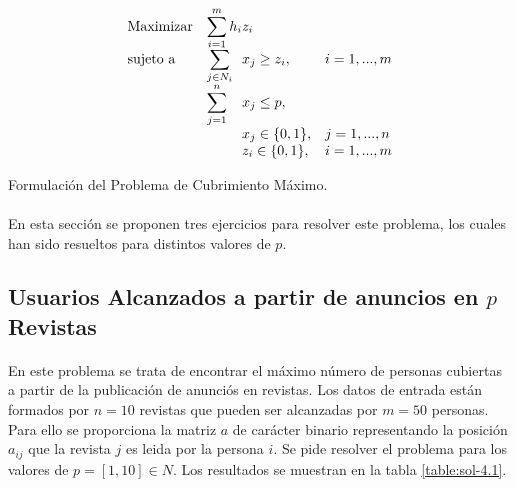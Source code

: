 \documentclass[spanish]{article}
\begin{document}
		\begin{eqfloat}
			\begin{equation}
				\begin{array}{ll@{}ll}
					\text{Maximizar}
						& \displaystyle\sum\limits_{i = 1}^{m} h_{i} & z_{i} 			&							\\
					\text{sujeto a}
						& \displaystyle\sum\limits_{j \in N_i}& x_{j} \geq z_i,		&i=1 ,..., m	\\
						& \displaystyle\sum\limits_{j = 1}^n 	& x_{j} \leq p,  		& 						\\
						&                                     &	x_{j} \in \{0,1\},&j=1 ,..., n 	\\
						&                                     &	z_{i} \in \{0,1\},&i=1 ,..., m  \\
				\end{array}
			\end{equation}
			\caption{Formulación del Problema de Cubrimiento Máximo.}
      \label{eq:max_covering}
    \end{eqfloat}

			\paragraph{}
			En esta sección se proponen tres ejercicios para resolver este problema, los cuales han sido resueltos para distintos valores de $p$.

		\subsection{Usuarios Alcanzados a partir de anuncios en $p$ Revistas}
		\label{sec:4.1}

			\paragraph{}
			En este problema se trata de encontrar el máximo número de personas cubiertas a partir de la publicación de anunciós en revistas. Los datos de entrada están formados por $n = 10$ revistas que pueden ser alcanzadas por $m = 50$  personas. Para ello se proporciona la matriz $a$ de carácter binario representando la posición $a_{ij}$ que la revista $j$ es leida por la persona $i$. Se pide resolver el problema para los valores de $p = [1, 10] \in N$. Los resultados se muestran en la tabla \ref{table:sol-4.1}.
\end{document}

